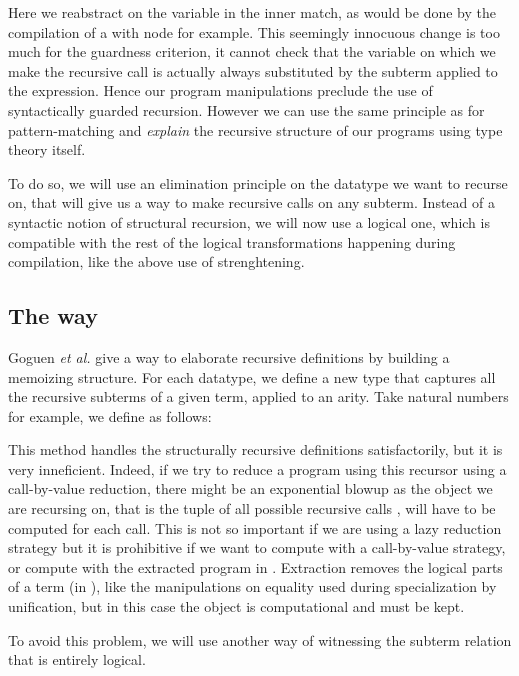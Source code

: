 Here we reabstract on the  variable in the inner match, as would
be done by the compilation of a with node for example. This seemingly 
innocuous change is too much for the guardness criterion, it cannot
check that the  variable on which we make the recursive call
is actually always substituted by the subterm  applied to
the  expression. Hence our program manipulations preclude
the use of syntactically guarded recursion. However we 
can use the same principle as for pattern-matching and 
\emph{explain} the recursive structure of our programs using type theory
itself. 

To do so, we will use an elimination principle on the datatype we want
to recurse on, that will give us a way to make recursive calls on any
subterm. Instead of a syntactic notion of structural recursion, we will now use a
logical one, which is compatible with the rest of the logical
transformations happening during compilation, like the above use of
strenghtening.

\subsection{The \Below way}

Goguen {\it et al.} \citet{DBLP:conf/birthday/GoguenMM06} give a way to
elaborate recursive definitions by building a memoizing structure. 
For each datatype, we define a new type  that captures all
the recursive subterms of a given term, applied to an arity. 
Take natural numbers for example, we define  as follows:



This method handles the structurally recursive definitions
satisfactorily, but it is very inneficient. Indeed, if we try to reduce 
a program using this recursor using a call-by-value reduction,
there might be an exponential blowup as 
the object we are recursing on, that is the tuple of all possible
recursive calls , will have to be computed for each call. This is not 
so important if we are using a lazy reduction strategy but it is
prohibitive if we want to compute with a call-by-value strategy,
or compute with the extracted program in \ML. Extraction removes the 
logical parts of a term (in \Prop), like the manipulations on equality
used during specialization by unification, but in this case the
 object is computational and must be kept.

To avoid this problem, we will use another way of witnessing the subterm
relation that is entirely logical.

